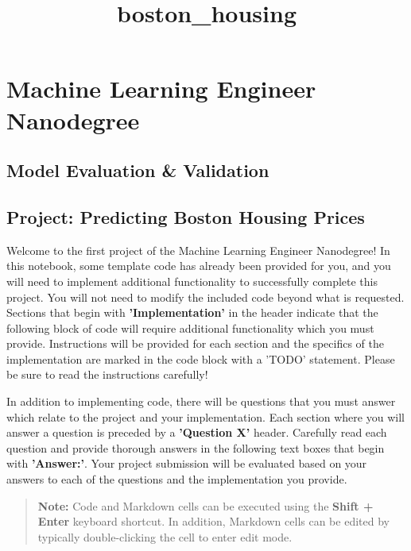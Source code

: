 \documentclass[11pt]{article}
\title{boston\_housing}
\begin{document}
    
    
    \maketitle
    
    

    
    \section{Machine Learning Engineer
Nanodegree}\label{machine-learning-engineer-nanodegree}

\subsection{Model Evaluation \&
Validation}\label{model-evaluation-validation}

\subsection{Project: Predicting Boston Housing
Prices}\label{project-predicting-boston-housing-prices}

Welcome to the first project of the Machine Learning Engineer
Nanodegree! In this notebook, some template code has already been
provided for you, and you will need to implement additional
functionality to successfully complete this project. You will not need
to modify the included code beyond what is requested. Sections that
begin with \textbf{'Implementation'} in the header indicate that the
following block of code will require additional functionality which you
must provide. Instructions will be provided for each section and the
specifics of the implementation are marked in the code block with a
'TODO' statement. Please be sure to read the instructions carefully!

In addition to implementing code, there will be questions that you must
answer which relate to the project and your implementation. Each section
where you will answer a question is preceded by a \textbf{'Question X'}
header. Carefully read each question and provide thorough answers in the
following text boxes that begin with \textbf{'Answer:'}. Your project
submission will be evaluated based on your answers to each of the
questions and the implementation you provide.

\begin{quote}
\textbf{Note:} Code and Markdown cells can be executed using the
\textbf{Shift + Enter} keyboard shortcut. In addition, Markdown cells
can be edited by typically double-clicking the cell to enter edit mode.
\end{quote}
\end{document}
